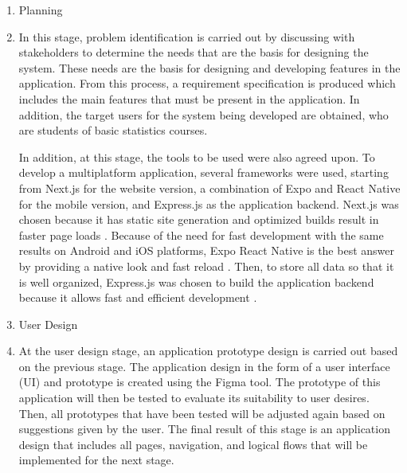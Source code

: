 \documentclass[conference,a4paper]{IEEEtran}
\begin{document}
\noindent
\begin{enumerate}
  \item Planning
  \item[] In this stage, problem identification is carried out by discussing with stakeholders to determine the needs that are the basis for designing the system. These needs are the basis for designing and developing features in the application. From this process, a requirement specification is produced which includes the main features that must be present in the application. In addition, the target users for the system being developed are obtained, who are students of basic statistics courses.

        In addition, at this stage, the tools to be used were also agreed upon. To develop a multiplatform application, several frameworks were used, starting from Next.js for the website version, a combination of Expo and React Native for the mobile version, and Express.js as the application backend. Next.js was chosen because it has static site generation and optimized builds result in faster page loads \cite{b20}. Because of the need for fast development with the same results on Android and iOS platforms, Expo React Native is the best answer by providing a native look and fast reload \cite{b21}. Then, to store all data so that it is well organized, Express.js was chosen to build the application backend because it allows fast and efficient development \cite{b22}.

  \item User Design
  \item [] At the user design stage, an application prototype design is carried out based on the previous stage. The application design in the form of a user interface (UI) and prototype is created using the Figma tool. The prototype of this application will then be tested to evaluate its suitability to user desires. Then, all prototypes that have been tested will be adjusted again based on suggestions given by the user. The final result of this stage is an application design that includes all pages, navigation, and logical flows that will be implemented for the next stage.


\end{enumerate}
\end{document}
